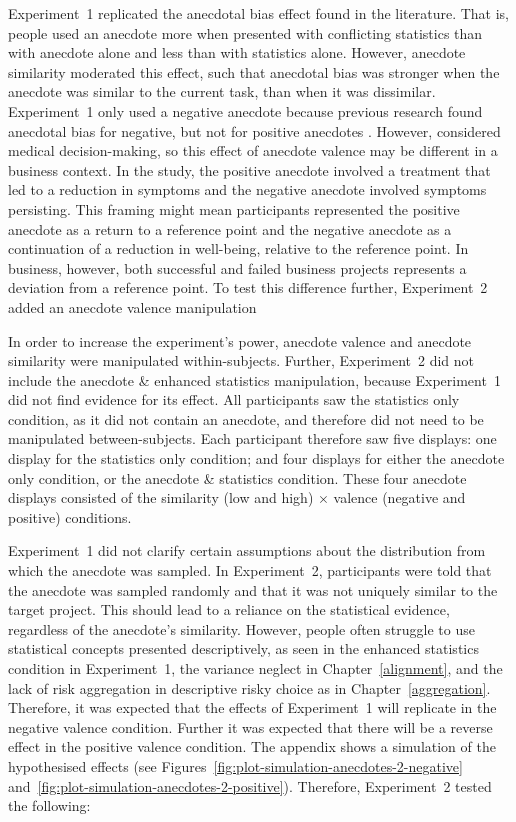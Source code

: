 \documentclass[a4paper, nobind, dvipsnames]{templates/ociamthesis}
\theoremstyle{definition}
\theoremstyle{definition}
\theoremstyle{definition}
\theoremstyle{definition}
\theoremstyle{remark}
\begin{document}
Experiment~1 replicated the anecdotal bias effect found in the literature. That
is, people used an anecdote more when presented with conflicting statistics than
with anecdote alone and less than with statistics alone. However, anecdote
similarity moderated this effect, such that anecdotal bias was stronger when the
anecdote was similar to the current task, than when it was dissimilar.
Experiment~1 only used a negative anecdote because previous research found
anecdotal bias for negative, but not for positive anecdotes \autocite{jaramillo2019}.
However, \textcite{jaramillo2019} considered medical decision-making, so this effect of
anecdote valence may be different in a business context. In the study, the
positive anecdote involved a treatment that led to a reduction in symptoms and
the negative anecdote involved symptoms persisting. This framing might mean
participants represented the positive anecdote as a return to a reference point
and the negative anecdote as a continuation of a reduction in well-being,
relative to the reference point. In business, however, both successful and
failed business projects represents a deviation from a reference point. To test
this difference further, Experiment~2 added an anecdote valence manipulation

In order to increase the experiment's power, anecdote valence and anecdote
similarity were manipulated within-subjects. Further, Experiment~2 did not
include the anecdote \& enhanced statistics manipulation, because Experiment~1
did not find evidence for its effect. All participants saw the statistics only
condition, as it did not contain an anecdote, and therefore did not need to be
manipulated between-subjects. Each participant therefore saw five displays: one
display for the statistics only condition; and four displays for either the
anecdote only condition, or the anecdote \& statistics condition. These four
anecdote displays consisted of the similarity (low and high) \(\times\) valence
(negative and positive) conditions.

Experiment~1 did not clarify certain assumptions about the distribution from
which the anecdote was sampled. In Experiment~2, participants were told that the
anecdote was sampled randomly and that it was not uniquely similar to the target
project. This should lead to a reliance on the statistical evidence, regardless
of the anecdote's similarity. However, people often struggle to use statistical
concepts presented descriptively, as seen in the enhanced statistics condition
in Experiment~1, the variance neglect in Chapter~\ref{alignment}, and the lack
of risk aggregation in descriptive risky choice as in
Chapter~\ref{aggregation}. Therefore, it was expected that the effects of
Experiment~1 will replicate in the negative valence condition. Further it was
expected that there will be a reverse effect in the positive valence condition.
The appendix shows a simulation of the hypothesised effects (see
Figures~\ref{fig:plot-simulation-anecdotes-2-negative}
and~\ref{fig:plot-simulation-anecdotes-2-positive}). Therefore, Experiment~2
tested the following:
\end{document}
